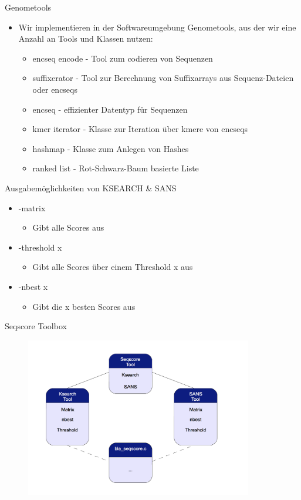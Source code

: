 \documentclass[xcolor=dvipsnames, aspectratio=1610]{beamer}
\begin{document}
\begin{frame}{Genometools}
  \begin{itemize}

    \item Wir implementieren in der Softwareumgebung Genometools, aus der wir eine Anzahl an Tools und Klassen nutzen:
    \begin{itemize}
      \item encseq encode - Tool zum codieren von Sequenzen 
      \item suffixerator - Tool zur Berechnung von Suffixarrays aus Sequenz-Dateien oder encseqs
      \item encseq - effizienter Datentyp für Sequenzen
      \item kmer iterator - Klasse zur Iteration über kmere von encseqs
      \item hashmap - Klasse zum Anlegen von Hashes
      \item ranked list - Rot-Schwarz-Baum basierte Liste

    \end{itemize}    
  \end{itemize}
\end{frame}


\begin{frame}{Ausgabemöglichkeiten von KSEARCH \& SANS}
  \begin{itemize}
    \item -matrix 
      \begin{itemize}
        \item Gibt alle Scores aus
      \end{itemize}           
    \item -threshold x 
      \begin{itemize}
        \item  Gibt alle Scores über einem Threshold x aus
      \end{itemize}
    \item -nbest x
      \begin{itemize}
        \item  Gibt die x besten Scores aus
      \end{itemize} 
  \end{itemize}
\end{frame}

\begin{frame}{Seqscore Toolbox}
  \begin{figure}[h]
    \includegraphics[height=7cm]{img/dia1.png}
  \end{figure}
\end{frame}
\end{document}
